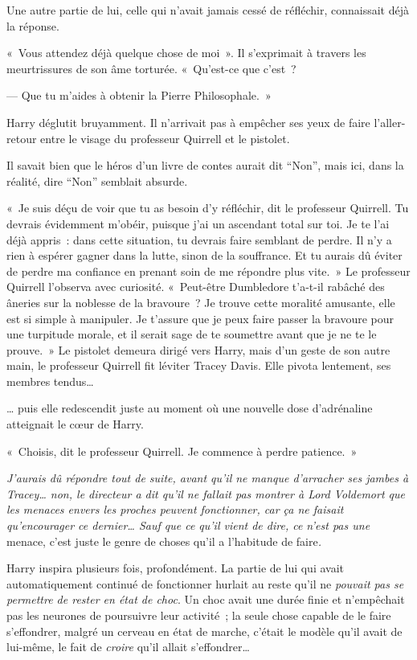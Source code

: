 Une autre partie de lui, celle qui n'avait jamais cessé de réfléchir, connaissait déjà la réponse.

«~Vous attendez déjà quelque chose de moi~». Il s'exprimait à travers les meurtrissures de son âme torturée. «~Qu'est-ce que c'est~?

--- Que tu m'aides à obtenir la Pierre Philosophale.~»

Harry déglutit bruyamment. Il n'arrivait pas à empêcher ses yeux de faire l'aller-retour entre le visage du professeur Quirrell et le pistolet.

Il savait bien que le héros d'un livre de contes aurait dit “Non”, mais ici, dans la réalité, dire “Non” semblait absurde.

«~Je suis déçu de voir que tu as besoin d'y réfléchir, dit le professeur Quirrell. Tu devrais évidemment m'obéir, puisque j'ai un ascendant total sur toi. Je te l'ai déjà appris~: dans cette situation, tu devrais faire semblant de perdre. Il n'y a rien à espérer gagner dans la lutte, sinon de la souffrance. Et tu aurais dû éviter de perdre ma confiance en prenant soin de me répondre plus vite.~» Le professeur Quirrell l'observa avec curiosité. «~Peut-être Dumbledore t'a-t-il rabâché des âneries sur la noblesse de la bravoure~? Je trouve cette moralité amusante, elle est si simple à manipuler. Je t'assure que je peux faire passer la bravoure pour une turpitude morale, et il serait sage de te soumettre avant que je ne te le prouve.~» Le pistolet demeura dirigé vers Harry, mais d'un geste de son autre main, le professeur Quirrell fit léviter Tracey Davis. Elle pivota lentement, ses membres tendus…

… puis elle redescendit juste au moment où une nouvelle dose d'adrénaline atteignait le cœur de Harry.

«~Choisis, dit le professeur Quirrell. Je commence à perdre patience.~»

\emph{J'aurais dû répondre tout de suite, avant qu'il ne manque d'arracher ses jambes à Tracey… non, le directeur a dit qu'il ne fallait pas montrer à Lord Voldemort que les menaces envers les proches peuvent fonctionner, car ça ne faisait qu'encourager ce dernier… Sauf que ce qu'il vient de dire, ce n'est pas une} menace, c'est juste le genre de choses qu'il a l'habitude de faire\emph{.}

Harry inspira plusieurs fois, profondément. La partie de lui qui avait automatiquement continué de fonctionner hurlait au reste qu'il ne \emph{pouvait pas se permettre de rester en état de choc}. Un choc avait une durée finie et n'empêchait pas les neurones de poursuivre leur activité~; la seule chose capable de le faire s'effondrer, malgré un cerveau en état de marche, c'était le modèle qu'il avait de lui-même, le fait de \emph{croire} qu'il allait s'effondrer…

